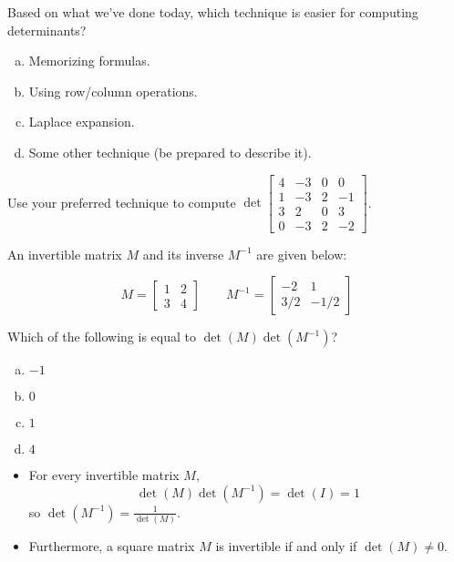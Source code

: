 \begin{activity}{5}
Based on what we've done today, which technique is easier for computing determinants?
\begin{enumerate}[(a)]
\item Memorizing formulas.
\item Using row/column operations.
\item Laplace expansion.
\item Some other technique (be prepared to describe it).
\end{enumerate}
\end{activity}

\begin{activity}{10}
  Use your preferred technique to compute 
  \(
    \det\begin{bmatrix} 
      4 & -3 & 0 & 0 \\ 
      1 & -3 & 2 & -1 \\ 
      3 & 2 & 0 & 3 \\ 
      0 & -3 & 2 & -2 
    \end{bmatrix}
  \).
\end{activity}

\begin{activity}{5}
  An invertible matrix \(M\) and its inverse \(M^{-1}\) are given below:
 
  \[
    M=\begin{bmatrix}1&2\\3&4\end{bmatrix}
  \hspace{2em}
    M^{-1}=\begin{bmatrix}-2&1\\3/2&-1/2\end{bmatrix}
  \]

\vspace{1em}

  Which of the following is equal to \(\det(M)\det(M^{-1})\)?

\begin{enumerate}[a)]
\item \(-1\)
\item \(0\)
\item \(1\)
\item \(4\)
\end{enumerate}
\end{activity}

\begin{fact}
  \begin{itemize}
\item   For every invertible matrix \(M\),
  \[
    \det(M)\det(M^{-1})= \det(I)=1
  \]
  so \(\det(M^{-1})=\frac{1}{\det(M)}\).

\item  Furthermore,
  a square matrix \(M\) is invertible if and only if \(\det(M)\not=0\).
  \end{itemize}
\end{fact}

